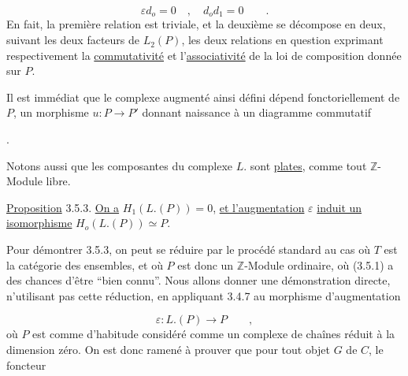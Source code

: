\begin{equation*}
\varepsilon d_o = 0 \quad , \quad d_o d_1 = 0 \qquad .
\end{equation*}
En fait, la première relation est triviale, et la deuxième se décompose en deux, suivant les deux facteurs de $L_2(P)$, les deux relations en question exprimant respectivement la \underline{commutativité} et l'\underline{associativité} de la
loi de composition donnée sur $P$.

Il est immédiat que le complexe augmenté ainsi défini dépend fonctoriellement de $P$, un morphisme $u : P \longrightarrow P'$ donnant naissance à un diagramme commutatif

\begin{center}
\quad .
\end{center}
Notons aussi que les composantes du complexe $L.$ sont \underline{plates}, comme tout $\mathbb{Z}$-Module libre.

\underline{Proposition} 3.5.3. \underline{On a} $H_1(L.(P))=0$, \underline{et l'augmentation} $\varepsilon$ \underline{induit un isomorphisme} $H_o(L.(P)) \simeq P$.

Pour démontrer 3.5.3, on peut se réduire par le procédé standard au cas où \underline{$T$} est la catégorie des ensembles, et où $P$ est donc un $\mathbb{Z}$-Module ordinaire, où (3.5.1) a des chances d'être ``bien connu''. Nous allons donner une démonstration directe, n'utilisant pas cette réduction, en appliquant 3.4.7 au morphisme d'augmentation

\begin{equation*}
\varepsilon : L.(P) \longrightarrow P \qquad ,
\end{equation*}
où $P$ est comme d'habitude considéré comme un complexe de chaînes réduit à la dimension zéro. On est donc ramené à prouver que pour tout objet $G$ de \underline{$C$}, le foncteur

